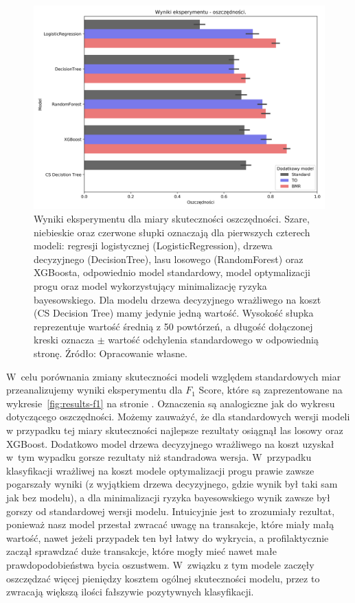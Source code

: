\documentclass[inzynierska]{pwr_wmat_praca_dyplomowa}
\theoremstyle{plain}
\numberwithin{theorem}{chapter}
\theoremstyle{definition}
\numberwithin{theorem}{chapter}
\begin{document}
\begin{figure}
	\includegraphics[width=\linewidth]{images/100_config1-Savings.png}
	\caption{Wyniki eksperymentu dla miary skuteczności oszczędności. Szare, niebieskie oraz czerwone słupki oznaczają dla pierwszych czterech modeli: regresji logistycznej (LogisticRegression), drzewa decyzyjnego (DecisionTree), lasu losowego (RandomForest) oraz XGBoosta, odpowiednio model standardowy, model optymalizacji progu oraz model wykorzystujący minimalizację ryzyka bayesowskiego. Dla modelu drzewa decyzyjnego wrażliwego na koszt (CS Decision Tree) mamy jedynie jedną wartość. Wysokość słupka reprezentuje wartość średnią z 50 powtórzeń, a długość dołączonej kreski oznacza $\pm$ wartość odchylenia standardowego w odpowiednią stronę. Źródło: Opracowanie własne.}
	\label{fig:results-savings}
\end{figure}

W~celu porównania zmiany skuteczności modeli względem standardowych miar przeanalizujemy wyniki eksperymentu dla $F_1$ Score, które są zaprezentowane na wykresie~\ref{fig:results-f1} na stronie \pageref{fig:results-savings}. Oznaczenia są analogiczne jak do wykresu dotyczącego oszczędności. Możemy zauważyć, że dla standardowych wersji modeli w przypadku tej miary skuteczności najlepsze rezultaty osiągnął las losowy oraz XGBoost. Dodatkowo model drzewa decyzyjnego wrażliwego na koszt uzyskał w~tym wypadku gorsze rezultaty niż standradowa wersja. W~przypadku klasyfikacji wrażliwej na koszt modele optymalizacji progu prawie zawsze pogarszały wyniki (z wyjątkiem drzewa decyzyjnego, gdzie wynik był taki sam jak bez modelu), a dla minimalizacji ryzyka bayesowskiego wynik zawsze był gorszy od standardowej wersji modelu. Intuicyjnie jest to zrozumiały rezultat, ponieważ nasz model przestał zwracać uwagę na transakcje, które miały małą wartość, nawet jeżeli przypadek ten był łatwy do wykrycia, a profilaktycznie zaczął sprawdzać duże transakcje, które mogły mieć nawet małe prawdopodobieństwa bycia oszustwem. W~związku z tym modele zaczęły oszczędzać więcej pieniędzy kosztem ogólnej skuteczności modelu, przez to zwracają większą ilości fałszywie pozytywnych klasyfikacji. 
\end{document}
